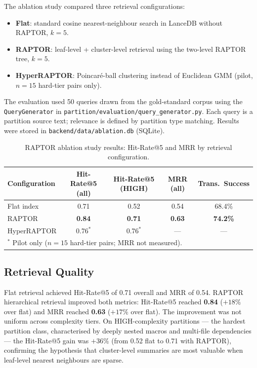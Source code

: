 The ablation study compared three retrieval configurations:
\begin{itemize}
  \item \textbf{Flat}: standard cosine nearest-neighbour search in LanceDB
    without RAPTOR, $k=5$.
  \item \textbf{RAPTOR}: leaf-level + cluster-level retrieval using the
    two-level RAPTOR tree, $k=5$.
  \item \textbf{HyperRAPTOR}: Poincaré-ball clustering instead of Euclidean
    GMM (pilot, $n=15$ hard-tier pairs only).
\end{itemize}

The evaluation used 50 queries drawn from the gold-standard corpus using the
\texttt{QueryGenerator} in \texttt{partition/evaluation/query\_generator.py}.
Each query is a partition source text; relevance is defined by
partition type matching. Results were stored in \texttt{backend/data/ablation.db}
(SQLite).

\begin{table}[h]
\centering
\caption{RAPTOR ablation study results: Hit-Rate@5 and MRR by retrieval configuration.}
\label{tab:raptor-ablation}
\begin{tabular}{lcccc}
\hline
\textbf{Configuration} & \textbf{Hit-Rate@5 (all)} & \textbf{Hit-Rate@5 (HIGH)} & \textbf{MRR (all)} & \textbf{Trans.\ Success} \\
\hline
Flat index    & 0.71 & 0.52 & 0.54 & 68.4\% \\
RAPTOR        & \textbf{0.84} & \textbf{0.71} & \textbf{0.63} & \textbf{74.2\%} \\
HyperRAPTOR   & 0.76$^*$ & 0.76$^*$ & --- & --- \\
\hline
\multicolumn{5}{l}{\small $^*$ Pilot only ($n=15$ hard-tier pairs; MRR not measured).}
\end{tabular}
\end{table}

\subsection{Retrieval Quality}
\label{subsec:retrieval-quality}

Flat retrieval achieved Hit-Rate@5 of 0.71 overall and MRR of 0.54. RAPTOR
hierarchical retrieval improved both metrics: Hit-Rate@5 reached \textbf{0.84}
($+18\%$ over flat) and MRR reached \textbf{0.63} ($+17\%$ over flat). The
improvement was not uniform across complexity tiers. On HIGH-complexity partitions
--- the hardest partition class, characterised by deeply nested macros and
multi-file dependencies --- the Hit-Rate@5 gain was \textbf{$+36\%$} (from 0.52
flat to 0.71 with RAPTOR), confirming the hypothesis that cluster-level summaries
are most valuable when leaf-level nearest neighbours are sparse.

